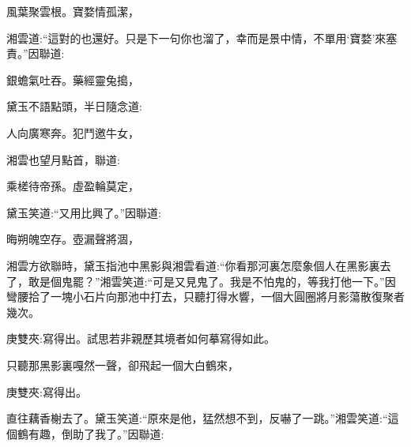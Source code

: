 \begin{poem}
    \begin{pl}風葉聚雲根。寶婺情孤潔，\end{pl}
\end{poem}


\begin{parag}
    湘雲道:“這對的也還好。只是下一句你也溜了，幸而是景中情，不單用‘寶婺’來塞責。”因聯道:
\end{parag}


\begin{poem}
    \begin{pl}銀蟾氣吐吞。藥經靈兔搗，\end{pl}
\end{poem}


\begin{parag}
    黛玉不語點頭，半日隨念道:
\end{parag}


\begin{poem}
    \begin{pl}人向廣寒奔。犯鬥邀牛女，\end{pl}
\end{poem}


\begin{parag}
    湘雲也望月點首，聯道:
\end{parag}


\begin{poem}
    \begin{pl}乘槎待帝孫。虛盈輪莫定，\end{pl}
\end{poem}


\begin{parag}
    黛玉笑道:“又用比興了。”因聯道:
\end{parag}


\begin{poem}
    \begin{pl}晦朔魄空存。壺漏聲將涸，\end{pl}
\end{poem}


\begin{parag}
    湘雲方欲聯時，黛玉指池中黑影與湘雲看道:“你看那河裏怎麼象個人在黑影裏去了，敢是個鬼罷？”湘雲笑道:“可是又見鬼了。我是不怕鬼的，等我打他一下。”因彎腰拾了一塊小石片向那池中打去，只聽打得水響，一個大圓圈將月影蕩散復聚者幾次。\begin{note}庚雙夾:寫得出。試思若非親歷其境者如何摹寫得如此。\end{note}只聽那黑影裏嘎然一聲，卻飛起一個大白鶴來，\begin{note}庚雙夾:寫得出。\end{note}直往藕香榭去了。黛玉笑道:“原來是他，猛然想不到，反嚇了一跳。”湘雲笑道:“這個鶴有趣，倒助了我了。”因聯道:
\end{parag}


